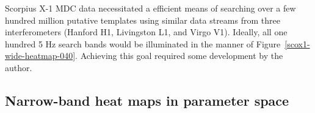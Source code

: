 Scorpius X-1 MDC data necessitated a efficient means of searching over a few hundred million putative templates using similar data streams from three interferometers (Hanford H1, Livingston L1, and Virgo V1).
Ideally, all one hundred 5 Hz search bands would be illuminated in the manner of Figure~\ref{scox1-wide-heatmap-040}.
Achieving this goal required some development by the author.


\subsection{Narrow-band heat maps in parameter space}


